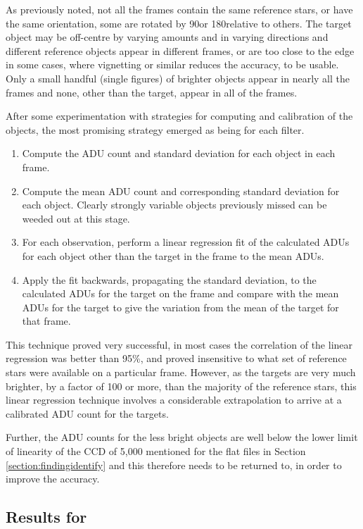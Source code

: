 As previously noted, not all the frames contain the same reference stars, or
have the same orientation, some are rotated by 90\degree or 180\degree relative to others. The
target object may be off-centre by varying amounts and in varying directions and
different reference objects appear in different frames, or are too close to the
edge in some cases, where vignetting or similar reduces the accuracy, to be
usable. Only a small handful (single figures) of brighter objects appear in
nearly all the frames and none, other than the target, appear in all of the
frames.

After some experimentation with strategies for computing and calibration of the
objects, the most promising strategy emerged as being for each filter.

\begin{enumerate}
  \item Compute the ADU count and standard deviation for each object in each
  frame.
  \item Compute the mean ADU count and corresponding standard
  deviation for each object. Clearly strongly variable objects previously missed can be weeded out
  at this stage.
  \item For each observation, perform a linear regression fit of the calculated
  ADUs for each object other than the target in the frame to the mean ADUs.
  \item Apply the fit backwards, propagating the standard deviation, to the
  calculated ADUs for the target on the frame and compare with the mean ADUs for
  the target to give the variation from the mean of the target for that frame.
\end{enumerate}

This technique proved very successful, in most cases the correlation of the
linear regression was better than 95\%, and proved insensitive to what set of
reference stars were available on a particular frame. However, as the targets
are very much brighter, by a factor of 100 or more, than the majority of the
reference stars, this linear regression technique involves a considerable
extrapolation to arrive at a calibrated ADU count for the targets.

Further, the ADU counts for the less bright objects are well below the lower
limit of linearity of the CCD of 5,000 mentioned for the flat files in Section
\ref{section:findingidentify} and this therefore needs to be returned to, in
order to improve the accuracy.

\subsection{Results for \ross}
\protect\label{section:resultsross}

